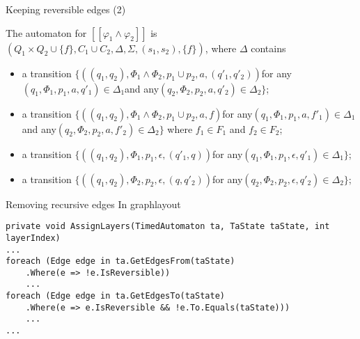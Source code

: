 \begin{frame}[fragile]{Keeping reversible edges (2)}
    \begin{definition}
        The automaton for $[\![\varphi_1\wedge\varphi_2]\!]$ is $(Q_1\times Q_2 \cup \{f\}, C_1\cup C_2,\Delta,\Sigma,(s_1,s_2),\{f\})$, where $\Delta$ contains
        \begin{itemize}
            \item a transition $\{((q_1,q_2),\Phi_1\wedge\Phi_2,p_1\cup p_2, a, (q'_1,q'_2))$for any$(q_1,\Phi_1,p_1,a,q'_1)\in\Delta_1$and any$(q_2,\Phi_2,p_2,a,q'_2)\in\Delta_2\}$;
            \item a transition $\{((q_1,q_2),\Phi_1\wedge\Phi_2,p_1\cup p_2, a, f)$for any$(q_1,\Phi_1,p_1,a,f'_1)\in\Delta_1$and any$(q_2,\Phi_2,p_2,a,f'_2)\in\Delta_2\}$ where $f_1\in F_1$ and $f_2\in F_2$;
            \item a transition $\{((q_1,q_2),\Phi_1,p_1,\epsilon,(q'_1,q))$for any$(q_1,\Phi_1,p_1,\epsilon,q'_1)\in\Delta_1\}$;
            \item a transition $\{((q_1,q_2),\Phi_2,p_2,\epsilon,(q,q'_2))$for any$(q_2,\Phi_2,p_2,\epsilon,q'_2)\in\Delta_2\}$;
        \end{itemize}
    \end{definition}

        
\end{frame}

\begin{frame}[fragile]{Removing recursive edges}
    In graphlayout
    \begin{lstlisting}[style=csharp,basicstyle=\tiny]
private void AssignLayers(TimedAutomaton ta, TaState taState, int layerIndex)
...
foreach (Edge edge in ta.GetEdgesFrom(taState)
    .Where(e => !e.IsReversible))
    ...
foreach (Edge edge in ta.GetEdgesTo(taState)
    .Where(e => e.IsReversible && !e.To.Equals(taState)))
    ...
...
    \end{lstlisting}
\end{frame}